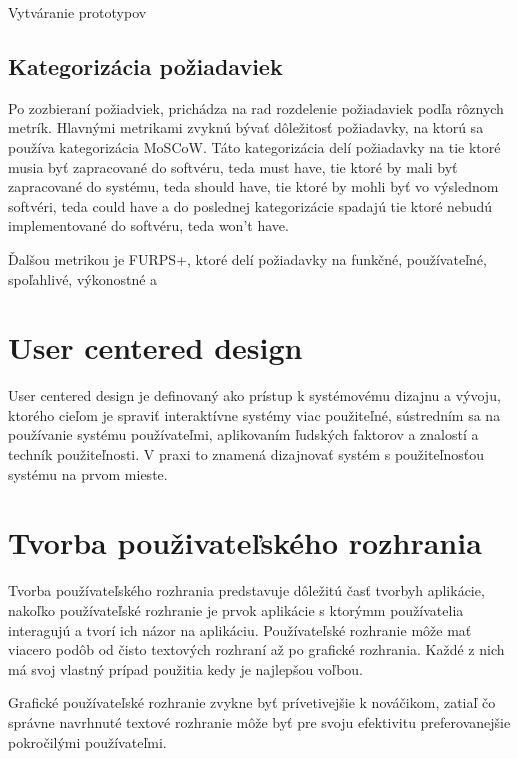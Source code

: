 Vytváranie prototypov




\subsection{Kategorizácia požiadaviek}
Po zozbieraní požiadviek, prichádza na rad rozdelenie požiadaviek podľa rôznych metrík. Hlavnými metrikami zvyknú bývať dôležitosť požiadavky, na ktorú sa používa kategorizácia MoSCoW. Táto kategorizácia delí požiadavky na tie ktoré musia byť zapracované do softvéru, teda must have, tie ktoré by mali byť zapracované do systému, teda should have, tie ktoré by mohli byť vo výslednom softvéri, teda could have a do poslednej kategorizácie spadajú tie ktoré nebudú implementované do softvéru, teda won't have.

Ďalšou metrikou je FURPS+, ktoré delí požiadavky na funkčné, používateľné, spoľahlivé, výkonostné a 


\section{User centered design}
User centered design je definovaný ako prístup k systémovému dizajnu a vývoju, ktorého cieľom je spraviť interaktívne systémy viac použiteľné, sústredním sa na používanie systému používateľmi, aplikovaním ľudských faktorov a znalostí a techník použiteľnosti.\cite{swe_vocabulary} V praxi to znamená dizajnovať systém s použiteľnosťou systému na prvom mieste.


\section{Tvorba použivateľského rozhrania}
Tvorba používateľského rozhrania predstavuje dôležitú časť tvorbyh aplikácie, nakoľko používateľské rozhranie je prvok aplikácie s ktorýmm používatelia interagujú a tvorí ich názor na aplikáciu. Používateľské rozhranie môže mať viacero podôb od čisto textových rozhraní až po grafické rozhrania. Každé z nich má svoj vlastný prípad použitia kedy je najlepšou voľbou. 

Grafické používateľské rozhranie zvykne byť prívetivejšie k nováčikom, zatiaľ čo správne navrhnuté textové rozhranie môže byť pre svoju efektivitu preferovanejšie pokročilými používateľmi.


